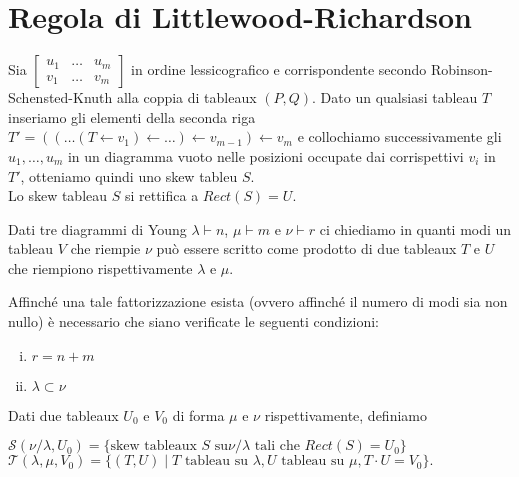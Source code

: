\chapter{Regola di Littlewood-Richardson}

\begin{prop}
Sia
\begin{math}
\begin{bmatrix}
u_1 & \ldots & u_m\\
v_1 & \ldots & v_m
\end{bmatrix}
\end{math}
in ordine lessicografico e corrispondente secondo
Robinson-Schensted-Knuth alla coppia di tableaux $(P,Q)$. Dato un
qualsiasi tableau $T$ inseriamo gli elementi della seconda riga
$T' = ((\ldots (T \gets v_1) \gets \ldots ) \gets v_{m-1} ) \gets v_m$ e
collochiamo successivamente gli $u_1, \ldots, u_m$ in un diagramma
vuoto nelle posizioni occupate dai corrispettivi $v_i$ in $T'$,
otteniamo quindi uno skew tableu $S$.\\
Lo skew tableau $S$ si rettifica a $Rect(S)=U$.
\end{prop}

Dati tre diagrammi di Young $\lambda \vdash n$, $\mu \vdash m$ e $\nu
\vdash r$ ci chiediamo in quanti modi un tableau $V$ che riempie
$\nu$ pu\`o essere scritto come prodotto di due tableaux $T$ e $U$
che riempiono rispettivamente $\lambda$ e $\mu$.

\begin{oss}
Affinch\'e una tale fattorizzazione esista (ovvero affinch\'e il numero
di modi sia non nullo) \`e necessario che siano verificate le seguenti
condizioni:
\begin{enumerate}[(i)]
\item $r = n + m$
\item $\lambda \subset \nu$
\end{enumerate}
\end{oss}

\begin{defn}
Dati due tableaux $U_0$ e $V_0$ di forma $\mu$ e $\nu$
rispettivamente, definiamo
\begin{center}\begin{math}
\mathcal{S}(\nu/\lambda, U_0) = \{\text{skew tableaux } S \text{ su
}\nu/\lambda \text{ tali che } Rect(S) =U_0\}
\end{math}\\
\begin{math}
\mathcal{T}(\lambda, \mu, V_0)=\{(T,U) \mid T \text{ tableau su }
\lambda, U \text{ tableau su } \mu, T\cdot U=V_0\}.
\end{math}\end{center}
\end{defn}

